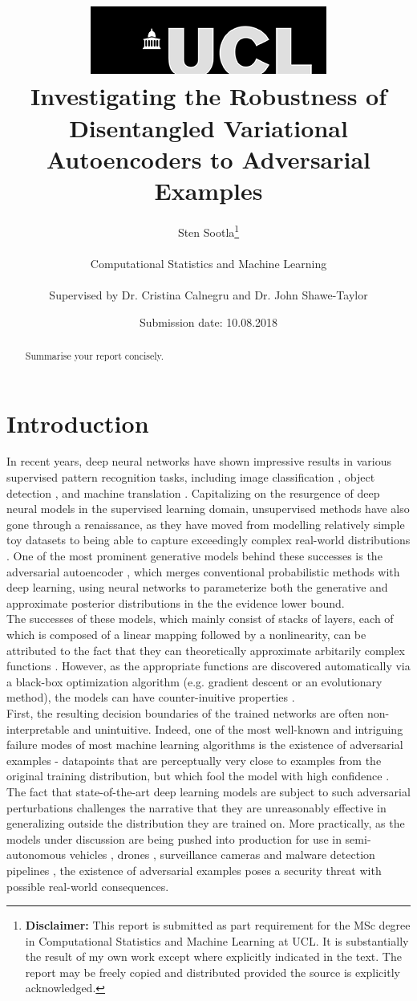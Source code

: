 \documentclass{report}
\title{  	{ \includegraphics[scale=.5,natwidth=294,natheight=84]{ucl_logo.png}}\\
{{\Huge Investigating the Robustness of Disentangled Variational Autoencoders to Adversarial Examples}}\\}
\date{Submission date: 10.08.2018}
\author{Sten Sootla\thanks{
{\bf Disclaimer:}
This report is submitted as part requirement for the MSc degree in Computational Statistics and Machine Learning at UCL. It is substantially the result of my own work except where explicitly indicated in the text. The report may be freely copied and distributed provided the source is explicitly acknowledged.}
\\ \\
Computational Statistics and Machine Learning\\ \\
Supervised by Dr. Cristina Calnegru and Dr. John Shawe-Taylor
}
\begin{document}
 
\onehalfspacing
\maketitle
\begin{abstract}
Summarise your report concisely.
\end{abstract}
\tableofcontents
\setcounter{page}{1}


\chapter{Introduction}



\noindent In recent years, deep neural networks have shown impressive results in various supervised pattern recognition tasks, including image classification \cite{alexnet, resnet}, object detection \cite{rcnn}, and machine translation \cite{nmt}. Capitalizing on the resurgence of deep neural models in the supervised learning domain, unsupervised methods have also gone through a renaissance, as they have moved from modelling relatively simple toy datasets to being able to capture exceedingly complex real-world distributions \cite{began, musicvae}. One of the most prominent generative models behind these successes is the adversarial autoencoder \cite{vae}, which merges conventional probabilistic methods with deep learning, using neural networks to parameterize both the generative and approximate posterior distributions in the the evidence lower bound. \\

\noindent The successes of these models, which mainly consist of stacks of layers, each of which is composed of a linear mapping followed by a nonlinearity, can be attributed to the fact that they can theoretically approximate arbitarily complex functions \cite{Cybenko1989}. However, as the appropriate functions are discovered automatically via a black-box optimization algorithm (e.g. gradient descent or an evolutionary method), the models can have counter-inuitive properties \cite{intriguing-properties}. \\

\noindent First, the resulting decision boundaries of the trained networks are often non-interpretable and unintuitive. Indeed, one of the most well-known and intriguing failure modes of most machine learning algorithms is the existence of adversarial examples - datapoints that are perceptually very close to examples from the original training distribution, but which fool the model with high confidence \cite{intriguing-properties}. The fact that state-of-the-art deep learning models are subject to such adversarial perturbations challenges the narrative that they are unreasonably effective in generalizing outside the distribution they are trained on. More practically, as the models under discussion are being pushed into production for use in semi-autonomous vehicles \cite{nvidia-self-driving-cars}, drones \cite{drones}, surveillance cameras \cite{surveillance-cameras} and malware detection pipelines \cite{malware}, the existence of adversarial examples poses a security threat with possible real-world consequences. \\
\end{document}
